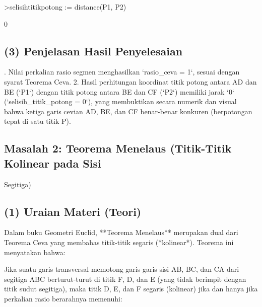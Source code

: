 \documentclass{article}
\newenvironment{eulernotebook}{\par}{\par}
\newcommand{\eulersubheading}[1]{\subsection{#1}}
\newenvironment{eulercomment}{\par\medskip}{\par\medskip}
\begin{document}
\begin{eulernotebook}
\begin{eulercomment}
\begin{eulercomment}
\begin{eulercomment}
\begin{eulercomment}
\begin{eulerprompt}
>selisihtitikpotong := distance(P1, P2)
\end{eulerprompt}
\begin{euleroutput}
  0
\end{euleroutput}
\eulersubheading{(3) Penjelasan Hasil Penyelesaian}
\begin{eulercomment}
1. Nilai perkalian rasio segmen menghasilkan `rasio\_ceva = 1`, sesuai
dengan syarat Teorema Ceva. 2. Hasil perhitungan koordinat titik
potong antara AD dan BE (`P1`) dengan titik potong antara BE dan CF
(`P2`) memiliki jarak `0` (`selisih\_titik\_potong = 0`), yang
membuktikan secara numerik dan visual bahwa ketiga garis cevian AD,
BE, dan CF benar-benar konkuren (berpotongan tepat di satu titik P).

\end{eulercomment}
\eulersubheading{Masalah 2: Teorema Menelaus (Titik-Titik Kolinear pada Sisi}
\begin{eulercomment}
Segitiga)

\end{eulercomment}
\eulersubheading{(1) Uraian Materi (Teori)}
\begin{eulercomment}
Dalam buku Geometri Euclid, **Teorema Menelaus** merupakan dual dari
Teorema Ceva yang membahas titik-titik segaris (*kolinear*). Teorema
ini menyatakan bahwa:

Jika suatu garis transversal memotong garis-garis sisi AB, BC, dan CA
dari segitiga ABC berturut-turut di titik F, D, dan E (yang tidak
berimpit dengan titik sudut segitiga), maka titik D, E, dan F segaris
(kolinear) jika dan hanya jika perkalian rasio berarahnya memenuhi:


\end{eulercomment}
\end{eulercomment}
\end{eulercomment}
\end{eulercomment}
\end{eulercomment}
\end{eulernotebook}
\end{document}

